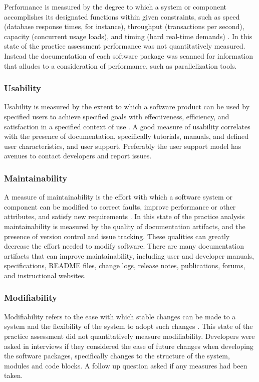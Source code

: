 \documentclass[12pt, notitlepage]{article}
\begin{document}
Performance is measured by the degree to which a system or component accomplishes its designated functions within given constraints, such as speed (database response times, for instance), throughput (transactions per second), capacity (concurrent usage loads), and timing (hard real-time demands) \citep{IEEEStdGlossarySET1990} \citep{wiegers2003softreq}. In this state of the practice assessment performance was not quantitatively measured. Instead the documentation of each software package was scanned for information that alludes to a consideration of performance, such as parallelization tools. 

\subsubsection{Usability}

Usability is measured by the extent to which a software product can be used by specified users to achieve specified goals with effectiveness, efficiency, and satisfaction in a specified context of use \citep{nielsonusability}. A good measure of usability correlates with the presence of documentation, specifically tutorials, manuals, and defined user characteristics, and user support. Preferably the user support model has avenues to contact developers and report issues.

\subsubsection{Maintainability}

A measure of maintainability is the effort with which a software
system or component can be modified to correct faults, improve performance or other attributes, and satisfy new requirements \citep{IEEEStdGlossarySET1990} \citep{boehm2007software}. In this state of the practice analysis maintainability is measured by the quality of documentation artifacts, and the presence of version control and issue tracking. These qualities can greatly decrease the effort needed to modify software. There are many documentation artifacts that can improve maintainability, including user and developer manuals, specifications, README files, change logs, release notes, publications, forums, and instructional websites. 

\subsubsection{Modifiability}

Modifiability refers to the ease with which stable changes can be made to a system and the flexibility of the system to adopt such changes \citep{8016712}.
This state of the practice assessment did not quantitatively measure modifiability. Developers were asked in interviews if they considered the ease of future changes when developing the software packages, specifically changes to the structure of the system, modules and code blocks. A follow up question asked if any measures had been taken.
\end{document}
